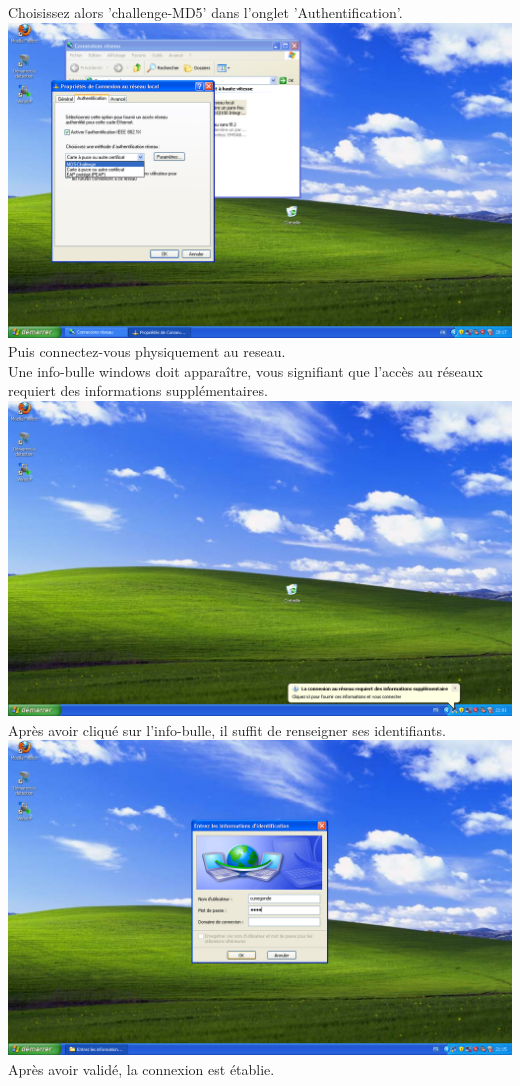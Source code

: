 Choisissez alors 'challenge-MD5' dans l'onglet 'Authentification'.\\
\includegraphics[width=\screenShotSize{}]{img/md5-challenge.PNG}\\
Puis connectez-vous physiquement au reseau.\\
Une info-bulle windows doit apparaître, vous signifiant que l'accès au réseaux requiert des informations supplémentaires.\\
\includegraphics[width=\screenShotSize{}]{img/md5Info.PNG}\\
Après avoir cliqué sur l'info-bulle, il suffit de renseigner ses identifiants.\\
\includegraphics[width=\screenShotSize{}]{img/credentials.PNG}\\
Après avoir validé, la connexion est établie.



